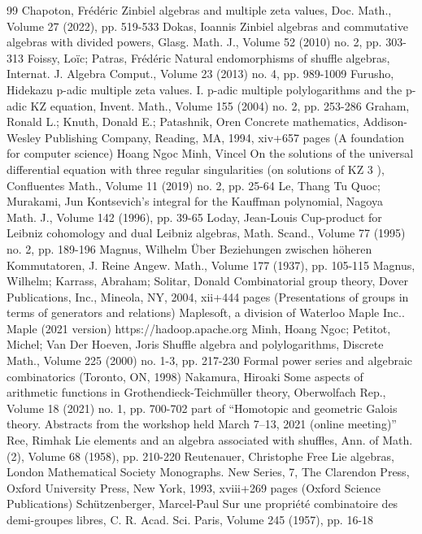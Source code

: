 \documentclass[10pt]{article}
\theoremstyle{definition}
\theoremstyle{remark}
\begin{document}
\begin{thebibliography}{99}
Chapoton, Frédéric Zinbiel algebras and multiple zeta values, Doc. Math., Volume 27 (2022), pp. 519-533
Dokas, Ioannis Zinbiel algebras and commutative algebras with divided powers, Glasg. Math. J., Volume 52 (2010) no. 2, pp. 303-313
Foissy, Loïc; Patras, Frédéric Natural endomorphisms of shuffle algebras, Internat. J. Algebra Comput., Volume 23 (2013) no. 4, pp. 989-1009
Furusho, Hidekazu p-adic multiple zeta values. I. p-adic multiple polylogarithms and the p-adic KZ equation, Invent. Math., Volume 155 (2004) no. 2, pp. 253-286
Graham, Ronald L.; Knuth, Donald E.; Patashnik, Oren Concrete mathematics, Addison-Wesley Publishing Company, Reading, MA, 1994, xiv+657 pages (A foundation for computer science)
Hoang Ngoc Minh, Vincel On the solutions of the universal differential equation with three regular singularities (on solutions of KZ 3 ), Confluentes Math., Volume 11 (2019) no. 2, pp. 25-64
Le, Thang Tu Quoc; Murakami, Jun Kontsevich’s integral for the Kauffman polynomial, Nagoya Math. J., Volume 142 (1996), pp. 39-65
Loday, Jean-Louis Cup-product for Leibniz cohomology and dual Leibniz algebras, Math. Scand., Volume 77 (1995) no. 2, pp. 189-196
Magnus, Wilhelm Über Beziehungen zwischen höheren Kommutatoren, J. Reine Angew. Math., Volume 177 (1937), pp. 105-115
Magnus, Wilhelm; Karrass, Abraham; Solitar, Donald Combinatorial group theory, Dover Publications, Inc., Mineola, NY, 2004, xii+444 pages (Presentations of groups in terms of generators and relations)
Maplesoft, a division of Waterloo Maple Inc.. Maple (2021 version) https://hadoop.apache.org
Minh, Hoang Ngoc; Petitot, Michel; Van Der Hoeven, Joris Shuffle algebra and polylogarithms, Discrete Math., Volume 225 (2000) no. 1-3, pp. 217-230 Formal power series and algebraic combinatorics (Toronto, ON, 1998)
Nakamura, Hiroaki Some aspects of arithmetic functions in Grothendieck-Teichmüller theory, Oberwolfach Rep., Volume 18 (2021) no. 1, pp. 700-702 part of “Homotopic and geometric Galois theory. Abstracts from the workshop held March 7–13, 2021 (online meeting)”
Ree, Rimhak Lie elements and an algebra associated with shuffles, Ann. of Math. (2), Volume 68 (1958), pp. 210-220
Reutenauer, Christophe Free Lie algebras, London Mathematical Society Monographs. New Series, 7, The Clarendon Press, Oxford University Press, New York, 1993, xviii+269 pages (Oxford Science Publications)
Schützenberger, Marcel-Paul Sur une propriété combinatoire des demi-groupes libres, C. R. Acad. Sci. Paris, Volume 245 (1957), pp. 16-18
\end{thebibliography}
\end{document}
